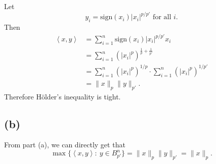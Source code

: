  Let 
\[ y_i = \mathrm{sign}(x_i) |x_i|^{p/p'} \text{ for all } i. \]
Then 
\begin{align*}
	\left\langle x, y \right\rangle 
	&= \sum_{i = 1}^{n} \mathrm{sign}(x_i)|x_i|^{p/p'} x_i \\
	&= \sum_{i = 1}^{n} (|x_i|^p)^{\frac{1}{p} + \frac{1}{p'}} \\
	&= \sum_{i = 1}^{n} (|x_i|^p)^{1/p} \cdot \sum_{i = 1}^{n} (|x_i|^p)^{1/p'} \\
	&= \lVert x \rVert_{p} \lVert y \rVert_{p'}.
\end{align*}
Therefore Hölder's inequality is tight.

\subsection*{(b)}
From part (a), we can directly get that 
\[ \max_{}\{ \left\langle x, y \right\rangle : \ y \in B_{p'}^n \} = 
\lVert x \rVert_{p} \lVert y \rVert_{p'} = \lVert x \rVert_{p}. \]
